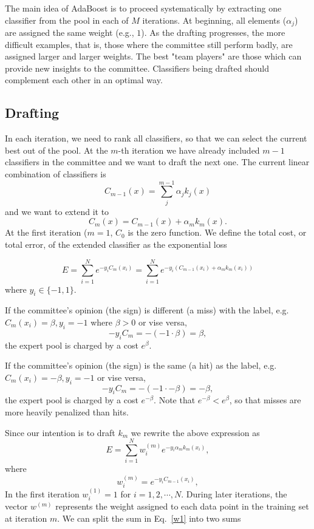 \documentclass[]{article}  %
\begin{document}
The main idea of AdaBoost is to proceed systematically by extracting one classifier from the pool in each of $M$ iterations. At beginning, all elements ($\alpha_j$) are assigned the same weight (e.g., $1$). As the drafting progresses, the more difficult examples, that is, those where the committee still perform badly, are assigned larger and larger weights. The best "team players" are those which can provide new insights to the committee. Classifiers being drafted should complement each other in an optimal way.

\subsection{Drafting}

In each iteration, we need to rank all classifiers, so that we can select the current best out of the pool. At the $m$-th iteration we have already included $m-1$ classifiers in the committee and we want to draft the next one. The current linear combination of classifiers is 
\[
C_{m-1}(x) = \sum_j^{m-1} \alpha_j k_j(x)
\]
and we want to extend it to
\[
C_m(x) = C_{m-1}(x) + \alpha_m k_m(x).
\]
At the first iteration ($m=1$, $C_0$ is the zero function. We define the total cost, or total error, of the extended classifier as the exponential loss

\[
E = \sum_{i=1}^N e^{-y_i C_{m}(x_i)} = \sum_{i=1}^N e^{-y_i (C_{m-1}(x_i) + \alpha_m k_m(x_i))}
\]
where $y_i \in \{-1,1\}$. 

If the committee's opinion (the sign) is different (a miss) with the label, e.g. $C_m(x_i) = \beta, y_i = -1$ where $\beta > 0$ or vise versa, 
\[
- y_i C_m = - (-1 \cdot \beta) = \beta,
\]
the expert pool is charged by a cost $e^\beta$.

If the committee's opinion (the sign) is the same (a hit) as the label, e.g. $C_m(x_i) = -\beta, y_i = -1$ or vise versa, 
\[
- y_i C_m = - (-1 \cdot -\beta) = -\beta,
\]
the expert pool is charged by a cost $e^{-\beta}$. Note that $e^{-\beta} < e^{\beta}$, so that misses are more heavily penalized than hits. 

Since our intention is to draft $k_m$ we rewrite the above expression as
\begin{equation}\label{w1}
E = \sum_{i=1}^N w_i^{(m)} e^{-y_i \alpha_m k_m(x_i)},
\end{equation}
where 
\begin{equation}
w_i^{(m)} = e^{-y_i C_{m-1} (x_i)},
\end{equation}
In the first iteration $w_i^{(1)} = 1 $ for $i=1,2,\cdots, N$. During later iterations, the vector $w^{(m)}$ represents the weight assigned to each data point in the training set at iteration $m$. We can split the sum in Eq.~\ref{w1} into two sums
\end{document}
